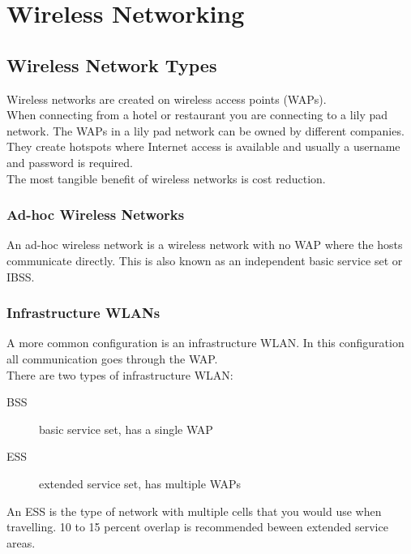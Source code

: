\section{Wireless Networking}

\subsection{Wireless Network Types}

Wireless networks are created on wireless access points (WAPs).\\

When connecting from a hotel or restaurant you are connecting to a lily pad
network. The WAPs in a lily pad network can be owned by different companies.
They create hotspots where Internet access is available and usually a username
and password is required.\\

The most tangible benefit of wireless networks is cost reduction.

\subsubsection{Ad-hoc Wireless Networks}

An ad-hoc wireless network is a wireless network with no WAP where the hosts
communicate directly. This is also known as an independent basic service set
or IBSS.

\subsubsection{Infrastructure WLANs}

A more common configuration is an infrastructure WLAN. In this configuration
all communication goes through the WAP.\\

There are two types of infrastructure WLAN:

\begin{description}

\item[BSS]
basic service set, has a single WAP

\item[ESS]
extended service set, has multiple WAPs

\end{description}

An ESS is the type of network with multiple cells that you would use when
travelling. 10 to 15 percent overlap is recommended beween extended service
areas.\\

